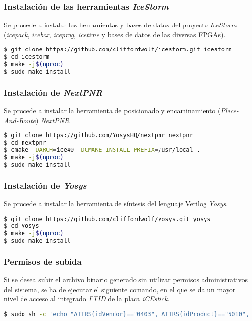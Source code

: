 \subsubsection{Instalación de las herramientas \emph{IceStorm}}
Se procede a instalar las herramientas y bases de datos del proyecto \emph{IceStorm} (\emph{icepack}, \emph{icebox}, \emph{iceprog}, \emph{icetime} y bases de datos de las diversas FPGAs).

\begin{lstlisting}[language=bash]
$ git clone https://github.com/cliffordwolf/icestorm.git icestorm
$ cd icestorm
$ make -j$(nproc)
$ sudo make install
\end{lstlisting}

\subsubsection{Instalación de \emph{NextPNR}}
Se procede a instalar la herramienta de posicionado y encaminamiento (\emph{Place-And-Route}) \emph{NextPNR}.

\begin{lstlisting}[language=bash]
$ git clone https://github.com/YosysHQ/nextpnr nextpnr
$ cd nextpnr
$ cmake -DARCH=ice40 -DCMAKE_INSTALL_PREFIX=/usr/local .
$ make -j$(nproc)
$ sudo make install
\end{lstlisting}

\subsubsection{Instalación de \emph{Yosys}}
Se procede a instalar la herramienta de síntesis del lenguaje Verilog \emph{Yosys}.

\begin{lstlisting}[language=bash]
$ git clone https://github.com/cliffordwolf/yosys.git yosys
$ cd yosys
$ make -j$(nproc)
$ sudo make install
\end{lstlisting}

\subsubsection{Permisos de subida}
Si se desea subir el archivo binario generado sin utilizar permisos administrativos del sistema, se ha de ejecutar el siguiente comando, en el que se da un mayor nivel de acceso al integrado \emph{FTID} de la placa \emph{iCEstick}.
\begin{lstlisting}[language=bash]
$ sudo sh -c 'echo "ATTRS{idVendor}=="0403", ATTRS{idProduct}=="6010", MODE="0660", GROUP="plugdev", TAG+="uaccess"" > /etc/udev/rules.d/53-lattice-ftdi.rules'
\end{lstlisting}


